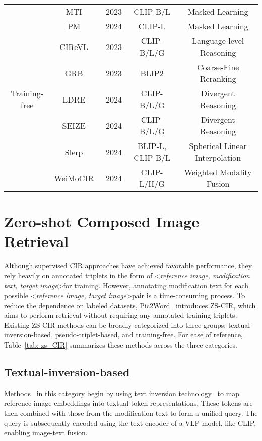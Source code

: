 \begin{table*}
\begin{tabular}{|c|c|c|c|c|}
    & MTI~\cite{mti} & 2023  & CLIP-B/L & Masked Learning\\
    \cline{2-5}
    & PM~\cite{pm} & 2024  & CLIP-L & Masked Learning\\
    
    
    \hline
    
    \multirow{5}{*}{Training-free} 
    & CIReVL~\cite{cirevl} & 2023  & CLIP-B/L/G & Language-level Reasoning\\
    \cline{2-5}
    & GRB~\cite{grb} & 2023  & BLIP2 & Coarse-Fine Reranking\\  
    \cline{2-5}
    & LDRE~\cite{ldre} & 2024  & CLIP-B/L/G & Divergent Reasoning\\ 
    \cline{2-5}
    & SEIZE~\cite{seize} & 2024  & CLIP-B/L/G & Divergent Reasoning\\
    \cline{2-5}
    & Slerp~\cite{slerp} & 2024  & BLIP-L, CLIP-B/L & Spherical Linear Interpolation\\
    \cline{2-5}
    & WeiMoCIR~\cite{weimocir}& 2024  & CLIP-L/H/G & Weighted Modality Fusion\\ 
    \hline
    \end{tabular}
\end{table*}


\section{Zero-shot Composed Image Retrieval}
Although supervised CIR approaches have achieved favorable performance, they rely heavily on annotated triplets in the form of \textless \emph{reference image, modification text, target image}\textgreater \hspace{0.2em}for training. However, annotating modification text for each possible \textless \emph{reference image, target image}\textgreater \hspace{0.2em}pair is a time-consuming process. To reduce the dependence on labeled datasets, Pic2Word~\cite{pic2word} introduces ZS-CIR, which aims to perform retrieval without requiring any annotated training triplets. 
Existing ZS-CIR methods can be broadly categorized into three groups: textual-inversion-based, pseudo-triplet-based, and training-free. 
For ease of reference, Table~\ref{tab: zs_CIR} summarizes these methods across the three categories. 


\subsection{Textual-inversion-based}
Methods~\cite{pic2word,searle,isearle,context_i2w,fti4cir,isa,keds,lincir} in this category begin by using text inversion technology~\cite{cohen2022my, gal2023an} to map reference image embeddings into textual token representations. These tokens are then combined with those from the modification text to form a unified query. The query is subsequently encoded using the text encoder of a VLP model, like CLIP, enabling image-text fusion.


